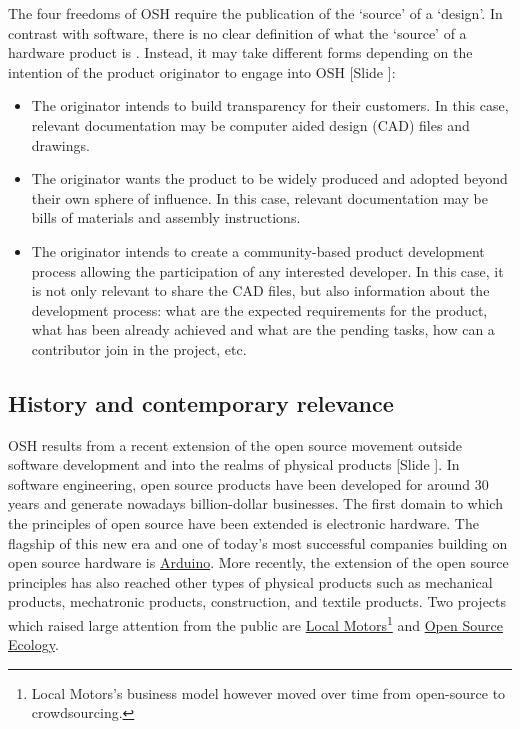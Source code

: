 \documentclass{article}
\newcounter{slide}
\begin{document}
The four freedoms of OSH require the publication of the `source' of a `design'. In contrast with software, there is no clear definition of what the `source' of a hardware product is \cite{bonvoisinWhatSourceOpen2017}. Instead, it may take different forms depending on the intention of the product originator to engage into OSH {\color{blue}[Slide ]}:
\begin{itemize}
  \item The originator intends to build transparency for their customers. In this case, relevant documentation may be computer aided design (CAD) files and drawings.
  \item The originator wants the product to be widely produced and adopted beyond their own sphere of influence. In this case, relevant documentation may be bills of materials and assembly instructions.
  \item The originator intends to create a community-based product development process allowing the participation of any interested developer. In this case, it is not only relevant to share the CAD files, but also information about the development process: what are the expected requirements for the product, what has been already achieved and what are the pending tasks, how can a contributor join in the project, etc.
\end{itemize}

\subsection{History and contemporary relevance}
\label{sec:OSHhistory}
OSH results from a recent extension of the open source movement outside software development and into the realms of physical products {\color{blue}[Slide ]}. In software engineering, open source products have been developed for around 30 years and generate nowadays billion-dollar businesses. The first domain to which the principles of open source have been extended is electronic hardware. The flagship of this new era and one of today's most successful companies building on open source hardware is \href{https://www.arduino.cc/}{Arduino}. More recently, the extension of the open source principles has also reached other types of physical products such as mechanical products, mechatronic products, construction, and textile products. Two projects which raised large attention from the public are \href{https://localmotors.com/}{Local Motors}\footnote{Local Motors's business model however moved over time from open-source to crowdsourcing.} and \href{https://www.opensourceecology.org/}{Open Source Ecology}. 
\end{document}
